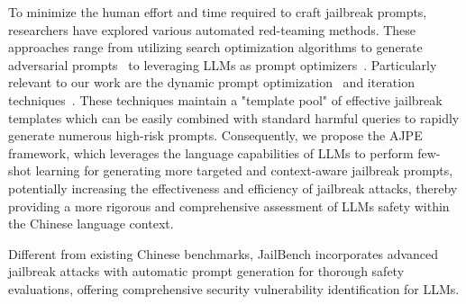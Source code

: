 To minimize the human effort and time required to craft jailbreak prompts, researchers have explored various automated red-teaming methods. These approaches range from utilizing search optimization algorithms to generate adversarial prompts~\cite{zou2023universal,lapid2023open} to leveraging LLMs as prompt optimizers~\cite{chao2023jailbreaking,zeng2024johnny}. Particularly relevant to our work are the dynamic prompt optimization~\cite{liu2023autodan} and iteration techniques~\cite{yu2023gptfuzzer}. These techniques maintain a "template pool" of effective jailbreak templates which can be easily combined with standard harmful queries to rapidly generate numerous high-risk prompts. Consequently, we propose the AJPE framework, which leverages the language capabilities of LLMs to perform few-shot learning for generating more targeted and context-aware jailbreak prompts, potentially increasing the effectiveness and efficiency of jailbreak attacks, thereby providing a more rigorous and comprehensive assessment of LLMs safety within the Chinese language context.

Different from existing Chinese benchmarks, JailBench incorporates advanced jailbreak attacks with automatic prompt generation for thorough safety evaluations, offering comprehensive security vulnerability identification for LLMs.